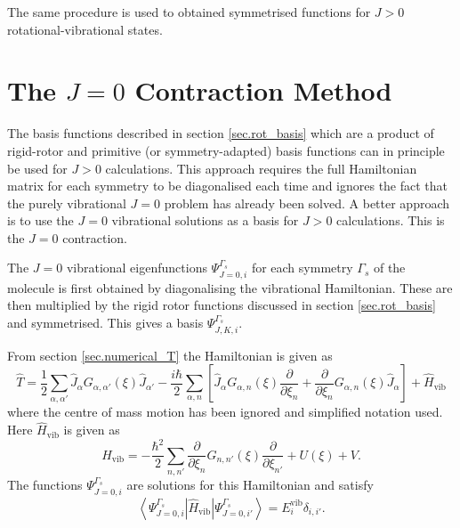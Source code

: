 The same procedure is used to obtained symmetrised functions for $J>0$ rotational-vibrational states.


\section{The $J=0$ Contraction Method}
The basis functions described in section \ref{sec.rot_basis} which are a product of rigid-rotor and primitive 
(or symmetry-adapted) basis functions can in principle be used for $J>0$ calculations. This approach requires the full
 Hamiltonian matrix 
for each symmetry to be diagonalised each time and ignores the fact that the purely vibrational $J=0$ problem has already
been solved. A better approach is to use the $J=0$ vibrational solutions as a basis for $J>0$ calculations. This is the
$J=0$ contraction. 

The $J=0$ vibrational eigenfunctions $\Psi_{J=0,i}^{\Gamma_s}$ for each symmetry $\Gamma_s$ of the molecule is 
first obtained by diagonalising the vibrational Hamiltonian. These are then multiplied by the rigid rotor functions 
discussed in section \ref{sec.rot_basis} and symmetrised. This gives a basis $\Psi^{\Gamma_s}_{J,K,i}$.

From section \ref{sec.numerical_T} the Hamiltonian is given as 
\begin{equation}
\label{eq.general_H_simp}
\hat{T} =  \frac{1}{2} \sum_{\alpha,\alpha'} \hat{J}_{\alpha} G_{\alpha,\alpha'}(\xi) \hat{J}_{\alpha'} 
           -\frac{i \hbar}{2} \sum_{\alpha,n}  \left[\hat{J}_{\alpha} G_{\alpha,n}(\xi) 
          \frac{\partial}{\partial \xi_n} + \frac{\partial}{\partial \xi_n} G_{\alpha,n}(\xi) \hat{J}_{\alpha} \right] 
           + \hat{H}_{\text{vib}}
\end{equation}
where the centre of mass motion has been ignored and simplified notation used. Here $\hat{H}_{\text{vib}}$ is given as
\begin{equation}
\label{eq.Hvib}
\hat{H}_{\text{vib}} = -\frac{\hbar^2}{2} \sum_{n,n'}  \frac{\partial}{\partial \xi_n} G_{n,n'}(\xi) 
          \frac{\partial}{\partial \xi_{n'}} + U(\xi) + V.
\end{equation}
The functions $\Psi_{J=0,i}^{\Gamma_s}$ are solutions for this Hamiltonian and satisfy
\begin{equation}
\label{eq.vib_orth}
\left< \Psi_{J=0,i}^{\Gamma_s} | \hat{H}_{\text{vib}} | \Psi_{J=0,i'}^{\Gamma_s} \right> = E_i^{\text{vib}} \delta_{i,i'}.
\end{equation}

